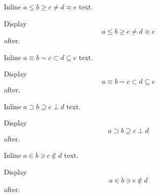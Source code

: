 \documentclass[12pt]{article}
\begin{document}
Inline $a \leq b \geq c \neq d \approx e$ text.

Display \[ a \leq b \geq c \neq d \approx e \] after.

Inline $a \equiv b \sim c \subset d \subseteq e$ text.

Display \[ a \equiv b \sim c \subset d \subseteq e \] after.

Inline $a \supset b \supseteq c \perp d$ text.

Display \[ a \supset b \supseteq c \perp d \] after.

Inline $a \in b \ni c \notin d$ text.

Display \[ a \in b \ni c \notin d \] after.
\end{document}
